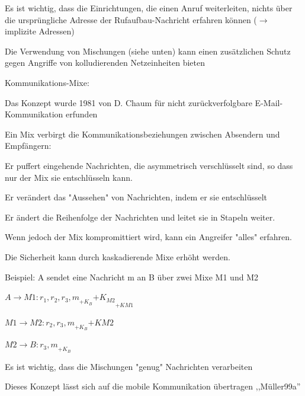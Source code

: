 \documentclass[a4paper]{article}
\begin{document}
\begin{multicols}{3}
\begin{itemize*}
\begin{itemize*}
\begin{itemize*}
                        \item Es ist wichtig, dass die Einrichtungen, die einen Anruf weiterleiten, nichts über die ursprüngliche Adresse der Rufaufbau-Nachricht erfahren können ($\rightarrow$ implizite Adressen)
                        \item Die Verwendung von Mischungen (siehe unten) kann einen zusätzlichen Schutz gegen Angriffe von kolludierenden Netzeinheiten bieten
                  \end{itemize*}
            \end{itemize*}
            \item Kommunikations-Mixe:
            \begin{itemize*}
                  \item Das Konzept wurde 1981 von D. Chaum für nicht zurückverfolgbare E-Mail-Kommunikation erfunden
                  \item Ein Mix verbirgt die Kommunikationsbeziehungen zwischen Absendern und Empfängern:
                  \begin{itemize*}
                        \item Er puffert eingehende Nachrichten, die asymmetrisch verschlüsselt sind, so dass nur der Mix sie entschlüsseln kann.
                        \item Er verändert das "Aussehen" von Nachrichten, indem er sie entschlüsselt
                        \item Er ändert die Reihenfolge der Nachrichten und leitet sie in Stapeln weiter.
                        \item Wenn jedoch der Mix kompromittiert wird, kann ein Angreifer "alles" erfahren.
                  \end{itemize*}
                  \item Die Sicherheit kann durch kaskadierende Mixe erhöht werden.
                  \item Beispiel: A sendet eine Nachricht m an B über zwei Mixe M1 und M2
                  \begin{itemize*}
                        \item $A\rightarrow M1: {r_1 ,{r_2 ,{r_3 , m}_{{+K_B}}}{+K_{M2}}}_{{+K}{M1}}$
                        \item $M1\rightarrow M2:{r_2 ,{r_3 , m}_{{+K_B}}}{+K{M2}}$
                        \item $M2\rightarrow B: {r_3 , m}_{+K_B}$
                        \item Es ist wichtig, dass die Mischungen "genug" Nachrichten verarbeiten
                  \end{itemize*}
                  \item Dieses Konzept lässt sich auf die mobile Kommunikation übertragen ,,Müller99a''
            \end{itemize*}
      \end{itemize*}



\end{multicols}
\end{document}
